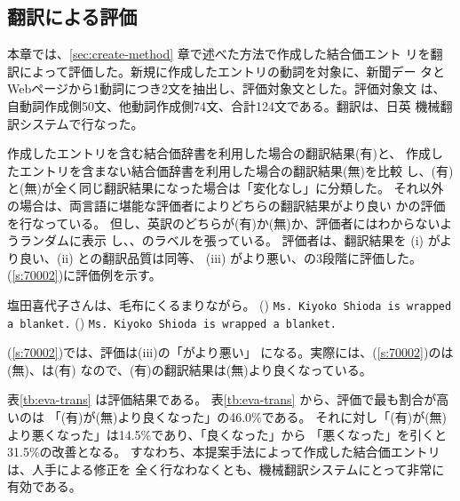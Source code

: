 \documentclass[japanese]{jnlp}
\newcommand{\iz}[1]{}
\newcommand{\ul}[1]{}
\newcommand{\altje}{}
\begin{document}
\subsection{翻訳による評価} \label{sec:eva-trans}


本章では、\ref{sec:create-method} 章で述べた方法で作成した結合価エント
リを翻訳によって評価した。新規に作成したエントリの動詞を対象に、新聞デー
タとWebページから1動詞につき2文を抽出し、評価対象文とした。評価対象文
は、自動詞作成側50文、他動詞作成側74文、合計124文である。翻訳は、日英
機械翻訳システム\altje で行なった。


作成したエントリを含む結合価辞書を利用した場合の翻訳結果(有)と、
作成したエントリを含まない結合価辞書を利用した場合の翻訳結果(無)を比較
し、(有)と(無)が全く同じ翻訳結果になった場合は「変化なし」に分類した。
それ以外の場合は、両言語に堪能な評価者によりどちらの翻訳結果がより良い
かの評価を行なっている。
但し、英訳のどちらが(有)か(無)か、評価者にはわからないようランダムに表示
し、\iz{A}、\iz{B}のラベルを張っている。
評価者は、翻訳結果を
(i) \iz{A}が\iz{B}より良い、(ii) \iz{A}と\iz{B}の翻訳品質は同等、
(iii) \iz{A}が\iz{B}より悪い、の3段階に評価した。
(\ref{s:70002})に評価例を示す。


\begin{exe}
\ex \label{s:70002}
 塩田喜代子さんは、毛布にくるまりながら。
\trans (\iz{A}) \texttt{Ms.\ Kiyoko Shioda is wrapped \ul{up to} a blanket.}
\trans (\iz{B}) \texttt{Ms.\ Kiyoko Shioda is wrapped \ul{in} a blanket.}
\end{exe}


(\ref{s:70002})では、評価は(iii)の「\iz{A}が\iz{B}より悪い」
になる。実際には、(\ref{s:70002})の\iz{A}は(無)、\iz{B}は(有)
なので、(有)の翻訳結果は(無)より良くなっている。


表\ref{tb:eva-trans} は評価結果である。
表\ref{tb:eva-trans} から、評価で最も割合が高いのは
「(有)が(無)より良くなった」の46.0\%である。
それに対し「(有)が(無)より悪くなった」は14.5\%であり、「良くなった」から
「悪くなった」を引くと31.5\%の改善となる。
すなわち、本提案手法によって作成した結合価エントリは、人手による修正を
全く行なわなくとも、機械翻訳システムにとって非常に有効である。
\end{document}
